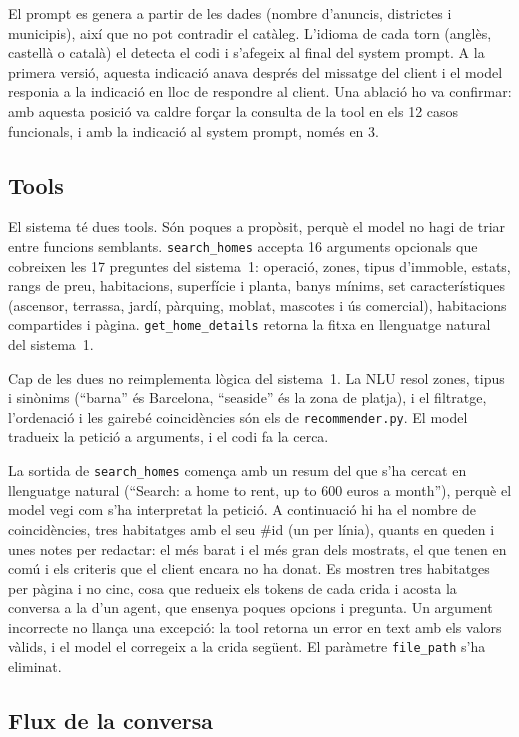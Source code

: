 \documentclass[10pt,a4paper]{article}
\begin{document}
El prompt es genera a partir de les dades (nombre d'anuncis, districtes i municipis), així que no pot contradir el catàleg. L'idioma de cada torn (anglès, castellà o català) el detecta el codi i s'afegeix al final del system prompt. A la primera versió, aquesta indicació anava després del missatge del client i el model responia a la indicació en lloc de respondre al client. Una ablació ho va confirmar: amb aquesta posició va caldre forçar la consulta de la tool en els 12 casos funcionals, i amb la indicació al system prompt, només en 3.

\subsection{Tools}

El sistema té dues tools. Són poques a propòsit, perquè el model no hagi de triar entre funcions semblants. \texttt{search\_homes} accepta 16 arguments opcionals que cobreixen les 17 preguntes del sistema~1: operació, zones, tipus d'immoble, estats, rangs de preu, habitacions, superfície i planta, banys mínims, set característiques (ascensor, terrassa, jardí, pàrquing, moblat, mascotes i ús comercial), habitacions compartides i pàgina. \texttt{get\_home\_details} retorna la fitxa en llenguatge natural del sistema~1.

Cap de les dues no reimplementa lògica del sistema~1. La NLU resol zones, tipus i sinònims (``barna'' és Barcelona, ``seaside'' és la zona de platja), i el filtratge, l'ordenació i les gairebé coincidències són els de \texttt{recommender.py}. El model tradueix la petició a arguments, i el codi fa la cerca.

La sortida de \texttt{search\_homes} comença amb un resum del que s'ha cercat en llenguatge natural (``Search: a home to rent, up to 600 euros a month''), perquè el model vegi com s'ha interpretat la petició. A continuació hi ha el nombre de coincidències, tres habitatges amb el seu \#id (un per línia), quants en queden i unes notes per redactar: el més barat i el més gran dels mostrats, el que tenen en comú i els criteris que el client encara no ha donat. Es mostren tres habitatges per pàgina i no cinc, cosa que redueix els tokens de cada crida i acosta la conversa a la d'un agent, que ensenya poques opcions i pregunta. Un argument incorrecte no llança una excepció: la tool retorna un error en text amb els valors vàlids, i el model el corregeix a la crida següent. El paràmetre \texttt{file\_path} s'ha eliminat.

\subsection{Flux de la conversa}
\end{document}
